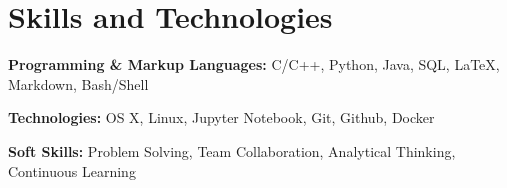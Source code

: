 \section{Skills and Technologies}

\begin{onecolentry}
    \textbf{Programming \& Markup Languages:} C/C++, Python, Java, SQL, LaTeX, Markdown, Bash/Shell
\end{onecolentry}

\vspace{0.2 cm} %

\begin{onecolentry}
    \textbf{Technologies:} OS X, Linux, Jupyter Notebook, Git, Github, Docker
\end{onecolentry}

\vspace{0.2 cm} %

\begin{onecolentry}
    \textbf{Soft Skills:} Problem Solving, Team Collaboration, Analytical Thinking, Continuous Learning
\end{onecolentry}
